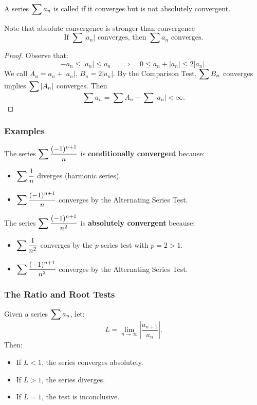 \begin{defn}
    A series $\displaystyle\sum a_n$ is called  if it converges but is not absolutely convergent.
\end{defn}

Note that absolute convergence is stronger than convergence
\[\text{If } \sum |a_n| \text{ converges, then } \sum a_n \text{ converges.}\]

\begin{proof}
    Observe that:
    \[-a_n \leq |a_n| \leq a_n \quad \implies \quad  0 \leq a_n + |a_n| \leq 2 |a_n|.\]
    We call $A_n = a_n + |a_n|$, $B_n = 2 |a_n|$. By the Comparison Test, $\displaystyle\sum B_n$ converges implies $\displaystyle\sum |A_n|$ converges. Then 
    \[\sum a_n = \sum A_n - \sum |a_n| < \infty. \]  
\end{proof}


\subsubsection{Examples}
\begin{ex}
    The series $\displaystyle\sum \dfrac{(-1)^{n+1}}{n}$ is \textbf{conditionally convergent} because:
    \begin{itemize}
        \item $\displaystyle\sum \dfrac{1}{n}$ diverges (harmonic series).
        \item $\displaystyle\sum \dfrac{(-1)^{n+1}}{n}$ converges by the Alternating Series Test.
    \end{itemize}
\end{ex}

\begin{ex}
    The series $\displaystyle\sum \dfrac{(-1)^{n+1}}{n^2}$ is \textbf{absolutely convergent} because:
    \begin{itemize}
        \item $\displaystyle\sum \dfrac{1}{n^2}$ converges by the $p$-series test with $p = 2 > 1$.
        \item $\displaystyle\sum \dfrac{(-1)^{n+1}}{n^2}$ converges by the Alternating Series Test.
    \end{itemize}
\end{ex}

\subsubsection{The Ratio and Root Tests}
\begin{thm}
    Given a series $\displaystyle\sum a_n$, let:
    \[L = \lim_{n \to \infty} \left| \dfrac{a_{n+1}}{a_n} \right|.\]
    Then:
    \begin{itemize}
        \item If $L < 1$, the series converges absolutely.
        \item If $L > 1$, the series diverges.
        \item If $L = 1$, the test is inconclusive.
    \end{itemize}
\end{thm}


